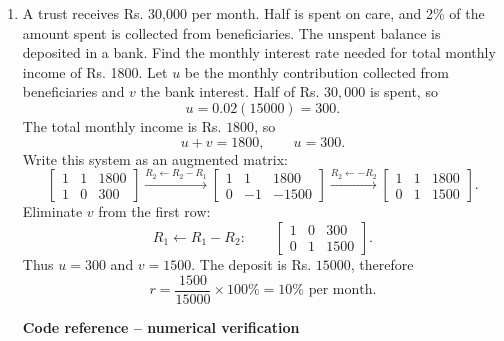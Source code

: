 \begin{enumerate}[label={},leftmargin=0pt,itemsep=9pt]
\item[\textbf{1.2.37}] A trust receives Rs. 30,000 per month. Half is spent on care, and 2\% of the amount spent is collected from beneficiaries. The unspent balance is deposited in a bank. Find the monthly interest rate needed for total monthly income of Rs. 1800.
\solution Let $u$ be the monthly contribution collected from beneficiaries and $v$ the bank interest. Half of Rs. $30,000$ is spent, so
\[
u=0.02(15000)=300.
\]
The total monthly income is Rs. $1800$, so
\[
u+v=1800,\qquad u=300.
\]
Write this system as an augmented matrix:
\[
\left[\begin{array}{cc|c}1&1&1800\\1&0&300\end{array}\right]
\xrightarrow{R_2\leftarrow R_2-R_1}
\left[\begin{array}{cc|c}1&1&1800\\0&-1&-1500\end{array}\right]
\xrightarrow{R_2\leftarrow -R_2}
\left[\begin{array}{cc|c}1&1&1800\\0&1&1500\end{array}\right].
\]
Eliminate $v$ from the first row:
\[
R_1\leftarrow R_1-R_2:\qquad
\left[\begin{array}{cc|c}1&0&300\\0&1&1500\end{array}\right].
\]
Thus $u=300$ and $v=1500$. The deposit is Rs. $15000$, therefore
\[
r=\frac{1500}{15000}\times100\%=10\%\text{ per month}.
\]
\par\smallskip
\noindent\textbf{Code reference -- numerical verification}
\par\noindent{}
\par\smallskip

\end{enumerate}

